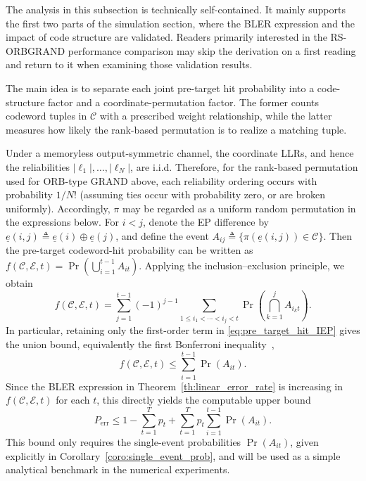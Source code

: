 \documentclass[letterpaper,draftclsnofoot,onecolumn]{IEEEtran}
\begin{document}
The analysis in this subsection is technically self-contained. It mainly supports the first two parts of the simulation section, where the BLER expression and the impact of code structure are validated. Readers primarily interested in the RS-ORBGRAND performance comparison may skip the derivation on a first reading and return to it when examining those validation results.

The main idea is to separate each joint pre-target hit probability into a code-structure factor and a coordinate-permutation factor. The former counts codeword tuples in $\mathcal{C}$ with a prescribed weight relationship, while the latter measures how likely the rank-based permutation is to realize a matching tuple.

Under a memoryless output-symmetric channel, the coordinate LLRs, and hence the reliabilities $|\ell_1|,\ldots,|\ell_N|$, are i.i.d. Therefore, for the rank-based permutation used for ORB-type GRAND above, each reliability ordering occurs with probability $1/N!$ (assuming ties occur with probability zero, or are broken uniformly). Accordingly, $\pi$ may be regarded as a uniform random permutation in the expressions below. For $i<j$, denote the EP difference by $\underline{e}(i,j)\triangleq\underline{e}(i)\oplus\underline{e}(j)$, and define the event $A_{ij}\triangleq \{\pi(\underline{e}(i,j))\in\mathcal{C}\}$. Then the pre-target codeword-hit probability can be written as $f(\mathcal{C},\mathcal{E},t)
= \Pr\!\left(\bigcup_{i=1}^{t-1}A_{it}\right)$. Applying the inclusion–exclusion principle, we obtain
\begin{equation}\label{eq:pre_target_hit_IEP}
f(\mathcal{C},\mathcal{E},t)
= \sum_{j=1}^{t-1}(-1)^{j-1}
\sum_{1\le i_1<\cdots<i_j<t}
\Pr\!\left(\bigcap_{k=1}^{j}A_{i_k t}\right).
\end{equation}
In particular, retaining only the first-order term in \eqref{eq:pre_target_hit_IEP} gives the union bound, equivalently the first Bonferroni inequality~\cite{feller1968probability},
\begin{equation}\label{eq:first_order_f_bound}
f(\mathcal{C},\mathcal{E},t)
\le \sum_{i=1}^{t-1}\Pr(A_{it}).
\end{equation}
Since the BLER expression in Theorem~\ref{th:linear_error_rate} is increasing in $f(\mathcal{C},\mathcal{E},t)$ for each $t$, this directly yields the computable upper bound
\begin{equation}\label{eq:first_order_bler_bound}
P_{\mathrm{err}}
\le
1-\sum_{t=1}^{T}p_t + 
\sum_{t=1}^{T}p_t\sum_{i=1}^{t-1}\Pr(A_{it}).
\end{equation}
This bound only requires the single-event probabilities $\Pr(A_{it})$, given explicitly in Corollary~\ref{coro:single_event_prob}, and will be used as a simple analytical benchmark in the numerical experiments.
\end{document}
